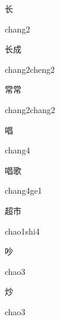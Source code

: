 \begin{multicols*}{2}
\begin{verbete}[chang2]{长}
\begin{pronuncia}{chang2}
\end{pronuncia}
\end{verbete}

\begin{verbete}{长成}
\begin{pronuncia}{chang2cheng2}
\end{pronuncia}
\end{verbete}

\begin{verbete}{常常}
\begin{pronuncia}{chang2chang2}
\end{pronuncia}
\end{verbete}

\begin{verbete}[chang4]{唱}
\begin{pronuncia}{chang4}
\end{pronuncia}
\end{verbete}

\begin{verbete}[chang4ge1]{唱歌}
\begin{pronuncia}{chang4ge1}
\end{pronuncia}
\end{verbete}

\begin{verbete}{超市}
\begin{pronuncia}{chao1shi4}
\end{pronuncia}
\end{verbete}

\begin{verbete}[chao3]{吵}
\begin{pronuncia}{chao3}
\end{pronuncia}
\end{verbete}

\begin{verbete}[chao3]{炒}
\begin{pronuncia}{chao3}
\end{pronuncia}
\end{verbete}


\end{multicols*}
